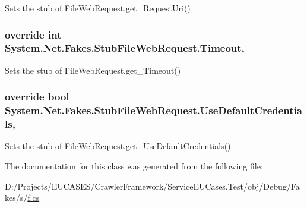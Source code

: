 Sets the stub of File\-Web\-Request.\-get\-\_\-\-Request\-Uri()

\hypertarget{class_system_1_1_net_1_1_fakes_1_1_stub_file_web_request_a15629b94d0e25660313dfd3f12a6a381}{
\subsubsection[{Timeout}]{\setlength{\rightskip}{0pt plus 5cm}override int System.\-Net.\-Fakes.\-Stub\-File\-Web\-Request.\-Timeout\hspace{0.3cm}{\ttfamily [get]}, {\ttfamily [set]}}}\label{class_system_1_1_net_1_1_fakes_1_1_stub_file_web_request_a15629b94d0e25660313dfd3f12a6a381}


Sets the stub of File\-Web\-Request.\-get\-\_\-\-Timeout()

\hypertarget{class_system_1_1_net_1_1_fakes_1_1_stub_file_web_request_aee70eb27bf80bd7c511afcea9e0dada0}{
\subsubsection[{Use\-Default\-Credentials}]{\setlength{\rightskip}{0pt plus 5cm}override bool System.\-Net.\-Fakes.\-Stub\-File\-Web\-Request.\-Use\-Default\-Credentials\hspace{0.3cm}{\ttfamily [get]}, {\ttfamily [set]}}}\label{class_system_1_1_net_1_1_fakes_1_1_stub_file_web_request_aee70eb27bf80bd7c511afcea9e0dada0}


Sets the stub of File\-Web\-Request.\-get\-\_\-\-Use\-Default\-Credentials()



The documentation for this class was generated from the following file\-:\begin{DoxyCompactItemize}
\item 
D\-:/\-Projects/\-E\-U\-C\-A\-S\-E\-S/\-Crawler\-Framework/\-Service\-E\-U\-Cases.\-Test/obj/\-Debug/\-Fakes/s/\hyperlink{s_2f_8cs}{f.\-cs}\end{DoxyCompactItemize}
